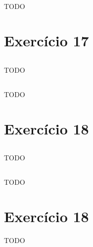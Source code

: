 \documentclass{article}
\begin{document}
\subsection{}
TODO

\section{Exercício 17}
\subsection{}
TODO
\subsection{}
TODO

\section{Exercício 18}
\subsection{}
TODO
\subsection{}
TODO

\section{Exercício 18}
TODO
\end{document}
